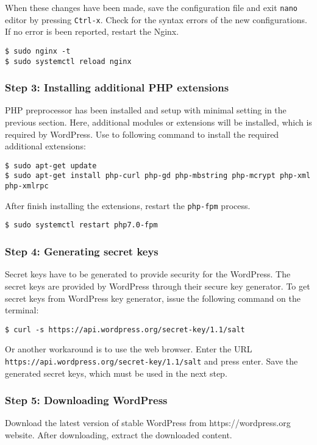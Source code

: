 When these changes have been made, save the configuration file and exit \texttt{nano} editor by pressing \texttt{Ctrl-x}. Check for the syntax errors of the new configurations. If no error is been reported, restart the Nginx.

\begin{lstlisting}
$ sudo nginx -t
$ sudo systemctl reload nginx
\end{lstlisting}

\subsubsection*{Step 3: Installing additional PHP extensions}
PHP preprocessor has been installed and setup with minimal setting in the previous section. Here, additional modules or extensions will be installed, which is required by WordPress. Use to following command to install the required additional extensions:

\begin{lstlisting}
$ sudo apt-get update
$ sudo apt-get install php-curl php-gd php-mbstring php-mcrypt php-xml php-xmlrpc
\end{lstlisting}

After finish installing the extensions, restart the \texttt{php-fpm} process.
\begin{lstlisting}
$ sudo systemctl restart php7.0-fpm
\end{lstlisting}

\subsubsection*{Step 4: Generating secret keys}
Secret keys have to be generated to provide security for the WordPress. The secret keys are provided by WordPress through their secure key generator. To get secret keys from WordPress key generator, issue the following command on the terminal:

\begin{lstlisting}
$ curl -s https://api.wordpress.org/secret-key/1.1/salt
\end{lstlisting}

Or another workaround is to use the web browser. Enter the URL \texttt{https://api.wordpress.org/secret-key/1.1/salt} and press enter. Save the generated secret keys, which must be used in the next step.


\subsubsection*{Step 5: Downloading WordPress}
Download the latest version of stable WordPress from https://wordpress.org website. After downloading, extract the downloaded content.

